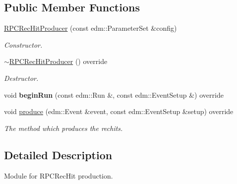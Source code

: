\subsection*{Public Member Functions}
\begin{DoxyCompactItemize}
\item 
\hypertarget{classRPCRecHitProducer_a009b5129b846e7a8e24c57ef7d53668a}{\hyperlink{classRPCRecHitProducer_a009b5129b846e7a8e24c57ef7d53668a}{R\-P\-C\-Rec\-Hit\-Producer} (const edm\-::\-Parameter\-Set \&config)}\label{classRPCRecHitProducer_a009b5129b846e7a8e24c57ef7d53668a}

\begin{DoxyCompactList}\small\item\em Constructor. \end{DoxyCompactList}\item 
\hypertarget{classRPCRecHitProducer_a34d1b71bf11aeaec9346fb56d2a87827}{\hyperlink{classRPCRecHitProducer_a34d1b71bf11aeaec9346fb56d2a87827}{$\sim$\-R\-P\-C\-Rec\-Hit\-Producer} () override}\label{classRPCRecHitProducer_a34d1b71bf11aeaec9346fb56d2a87827}

\begin{DoxyCompactList}\small\item\em Destructor. \end{DoxyCompactList}\item 
\hypertarget{classRPCRecHitProducer_a3f2c78ac3b002de8c97ea2268616cae4}{void {\bfseries begin\-Run} (const edm\-::\-Run \&, const edm\-::\-Event\-Setup \&) override}\label{classRPCRecHitProducer_a3f2c78ac3b002de8c97ea2268616cae4}

\item 
\hypertarget{classRPCRecHitProducer_a4bda2141c940e5baf40c9413147c2698}{void \hyperlink{classRPCRecHitProducer_a4bda2141c940e5baf40c9413147c2698}{produce} (edm\-::\-Event \&event, const edm\-::\-Event\-Setup \&setup) override}\label{classRPCRecHitProducer_a4bda2141c940e5baf40c9413147c2698}

\begin{DoxyCompactList}\small\item\em The method which produces the rechits. \end{DoxyCompactList}\end{DoxyCompactItemize}


\subsection{Detailed Description}
Module for R\-P\-C\-Rec\-Hit production.


